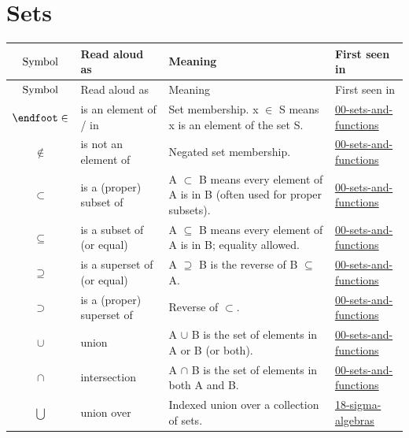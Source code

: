 \documentclass[10pt]{article}
\begin{document}
\section*{Sets}
\begin{longtable}{@{} >{$}c<{$} l p{6.5cm} l @{}}
\toprule
\textnormal{Symbol} & Read aloud as & Meaning & First seen in \\
\midrule
\endfirsthead
\toprule
\textnormal{Symbol} & Read aloud as & Meaning & First seen in \\
\midrule
\endhead
\bottomrule
\endfoot
\in & is an element of / in & Set membership. x $\in$ S means x is an element of the set S. & \href{https://github.com/pleyva2004/math-foundations/tree/main/concepts/00-sets-and-functions}{00-sets-and-functions} \\
\notin & is not an element of & Negated set membership. & \href{https://github.com/pleyva2004/math-foundations/tree/main/concepts/00-sets-and-functions}{00-sets-and-functions} \\
\subset & is a (proper) subset of & A $\subset$ B means every element of A is in B (often used for proper subsets). & \href{https://github.com/pleyva2004/math-foundations/tree/main/concepts/00-sets-and-functions}{00-sets-and-functions} \\
\subseteq & is a subset of (or equal) & A $\subseteq$ B means every element of A is in B; equality allowed. & \href{https://github.com/pleyva2004/math-foundations/tree/main/concepts/00-sets-and-functions}{00-sets-and-functions} \\
\supseteq & is a superset of (or equal) & A $\supseteq$ B is the reverse of B $\subseteq$ A. & \href{https://github.com/pleyva2004/math-foundations/tree/main/concepts/00-sets-and-functions}{00-sets-and-functions} \\
\supset & is a (proper) superset of & Reverse of $\subset$. & \href{https://github.com/pleyva2004/math-foundations/tree/main/concepts/00-sets-and-functions}{00-sets-and-functions} \\
\cup & union & A $\cup$ B is the set of elements in A or B (or both). & \href{https://github.com/pleyva2004/math-foundations/tree/main/concepts/00-sets-and-functions}{00-sets-and-functions} \\
\cap & intersection & A $\cap$ B is the set of elements in both A and B. & \href{https://github.com/pleyva2004/math-foundations/tree/main/concepts/00-sets-and-functions}{00-sets-and-functions} \\
\bigcup & union over & Indexed union over a collection of sets. & \href{https://github.com/pleyva2004/math-foundations/tree/main/concepts/18-sigma-algebras}{18-sigma-algebras} \\

\end{longtable}
\end{document}
